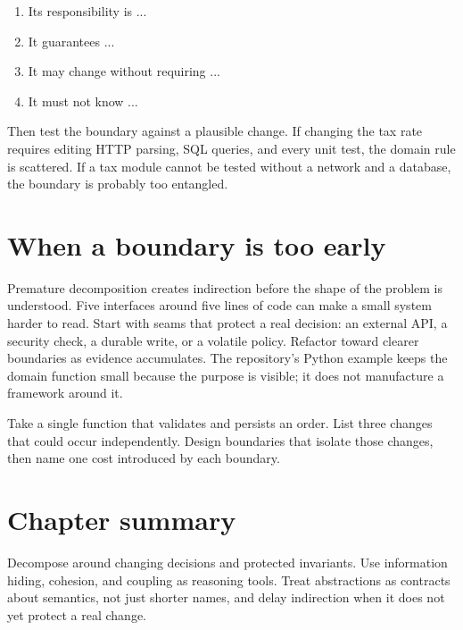 \begin{enumerate}
  \item Its responsibility is ...
  \item It guarantees ...
  \item It may change without requiring ...
  \item It must not know ...
\end{enumerate}

Then test the boundary against a plausible change. If changing the tax rate
requires editing HTTP parsing, SQL queries, and every unit test, the domain rule
is scattered. If a tax module cannot be tested without a network and a database,
the boundary is probably too entangled.

\section{When a boundary is too early}
Premature decomposition creates indirection before the shape of the problem is
understood. Five interfaces around five lines of code can make a small system
harder to read. Start with seams that protect a real decision: an external API,
a security check, a durable write, or a volatile policy. Refactor toward clearer
boundaries as evidence accumulates. The repository's Python example keeps the
domain function small because the purpose is visible; it does not manufacture a
framework around it.

\begin{exercise}
Take a single function that validates and persists an order. List three changes
that could occur independently. Design boundaries that isolate those changes,
then name one cost introduced by each boundary.
\end{exercise}

\section{Chapter summary}
Decompose around changing decisions and protected invariants. Use information
hiding, cohesion, and coupling as reasoning tools. Treat abstractions as
contracts about semantics, not just shorter names, and delay indirection when it
does not yet protect a real change.

